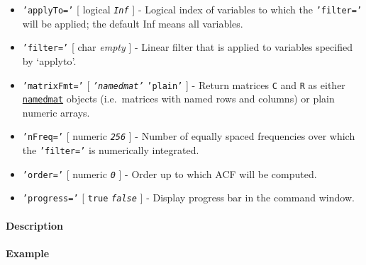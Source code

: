 \begin{itemize}
\item
  \texttt{'applyTo='} {[} logical \textbar{} \emph{\texttt{Inf}} {]} -
  Logical index of variables to which the \texttt{'filter='} will be
  applied; the default Inf means all variables.
\item
  \texttt{'filter='} {[} char \textbar{} \emph{empty} {]} - Linear
  filter that is applied to variables specified by `applyto'.
\item
  \texttt{'matrixFmt='} {[} \emph{\texttt{'namedmat'}} \textbar{}
  \texttt{'plain'} {]} - Return matrices \texttt{C} and \texttt{R} as
  either \href{namedmat/Contents}{\texttt{namedmat}} objects
  (i.e.~matrices with named rows and columns) or plain numeric arrays.
\item
  \texttt{'nFreq='} {[} numeric \textbar{} \emph{\texttt{256}} {]} -
  Number of equally spaced frequencies over which the \texttt{'filter='}
  is numerically integrated.
\item
  \texttt{'order='} {[} numeric \textbar{} \emph{\texttt{0}} {]} - Order
  up to which ACF will be computed.
\item
  \texttt{'progress='} {[} \texttt{true} \textbar{}
  \emph{\texttt{false}} {]} - Display progress bar in the command
  window.
\end{itemize}

\paragraph{Description}\label{description}

\paragraph{Example}\label{example}


